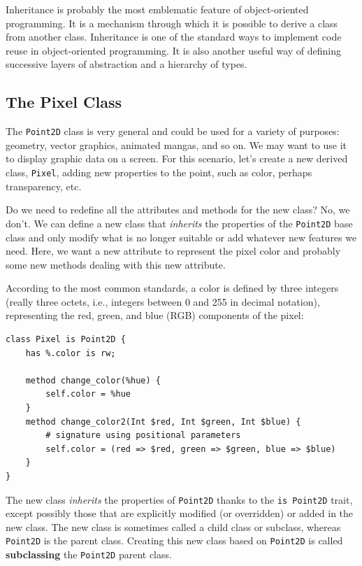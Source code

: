 Inheritance is probably the most emblematic feature of 
object-oriented programming. It is a mechanism through which it 
is possible to derive a class from another class. Inheritance is 
one of the standard ways to implement code reuse in 
object-oriented programming. It is also another useful way of 
defining successive layers of abstraction and a hierarchy of 
types.

\subsection{The Pixel Class}

The {\tt Point2D} class is very general and could be used for 
a variety of purposes: geometry, vector graphics, animated mangas, 
and so on. We may want to use it to display graphic data on a 
screen. For this scenario, let's create a new derived class, 
{\tt Pixel}, adding new properties to the point, such as color, 
perhaps transparency, etc. 

Do we need to redefine all the attributes and methods for 
the new class? No, we don't. We can define a new class that 
\emph{inherits} the properties of the {\tt Point2D} base class 
and only modify what is no longer suitable or add whatever 
new features we need. Here, we want a new attribute to represent 
the pixel color and probably some new methods dealing with this 
new attribute.

According to the most common standards, a color is defined 
by three integers (really three octets, i.e., integers 
between 0 and 255 in decimal notation), representing the red, 
green, and blue (RGB) components of the pixel:

\begin{verbatim}
class Pixel is Point2D {
    has %.color is rw;

    method change_color(%hue) {
        self.color = %hue
    }
    method change_color2(Int $red, Int $green, Int $blue) {
        # signature using positional parameters
        self.color = (red => $red, green => $green, blue => $blue)
    }
}
\end{verbatim}

The new class \emph{inherits} the properties of {\tt Point2D} 
thanks to the {\tt is Point2D} trait, except possibly those 
that are explicitly modified (or overridden) or added in 
the new class. The new class is sometimes called a 
child class or subclass, whereas {\tt Point2D} is the 
parent class. Creating this new class based on 
{\tt Point2D} is called {\bf subclassing} the {\tt Point2D} 
parent class. 

